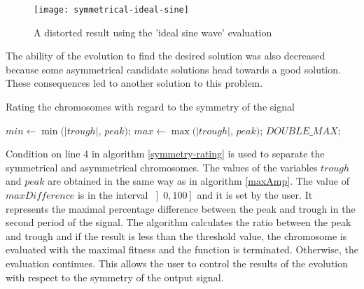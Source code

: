 \begin{figure}[H]
    \centerline{\texttt{[image: symmetrical-ideal-sine]}\label{symmetrical-ideal-sine}}
    \caption{A distorted result using the 'ideal sine wave' evaluation}
\end{figure}

The ability of the evolution to find the desired solution was also decreased because some asymmetrical candidate solutions head towards a good solution. These consequences led to another solution to this problem.

\begin{algorithm}
\caption{Rating the chromosomes with regard to the symmetry of the signal}
\label{symmetry-rating}
\begin{algorithmic}[1]
    \State $min \gets \min(|trough|$, $peak)$;
    \State $max \gets \max(|trough|$, $peak)$;
        \State \Return $DOUBLE\_MAX$;
    \EndIf
    \EndFunction
\end{algorithmic}
\end{algorithm}

Condition on line 4 in algorithm \ref{symmetry-rating} is used to separate the symmetrical and asymmetrical chromosomes. The values of the variables $trough$ and $peak$ are obtained in the same way as in algorithm \ref{maxAmp}. The value of $maxDifference$ is in the interval $\left]0, 100\right]$ and it is set by the user. It represents the maximal percentage difference between the peak and trough in the second period of the signal. The algorithm calculates the ratio between the peak and trough and if the result is less than the threshold value, the chromosome is evaluated with the maximal fitness and the function is terminated. Otherwise, the evaluation continues. This allows the user to control the results of the evolution with respect to the symmetry of the output signal.